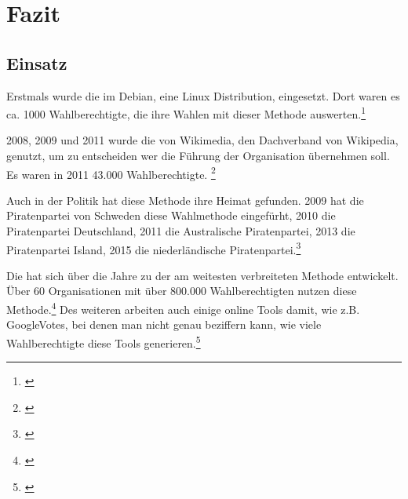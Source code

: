 \newpage
\section{Fazit}
\label{sec:Fazit}



\subsection{Einsatz} 
\label{sec:einsatz}
Erstmals wurde die  im Debian, eine Linux Distribution, eingesetzt. Dort waren es ca. 1000 Wahlberechtigte, die ihre Wahlen mit dieser Methode auswerten.\footnote{\Vgl \citet{Debian2018}}

2008, 2009 und 2011 wurde die \schulze von Wikimedia, den Dachverband von Wikipedia, genutzt, um zu entscheiden wer die Führung der Organisation übernehmen soll. Es waren in 2011 43.000 Wahlberechtigte. \footnote{\Vgl \citet{Schulze2017}}

Auch in der Politik hat diese Methode ihre Heimat gefunden. 2009 hat die Piratenpartei von Schweden diese Wahlmethode eingefürht, 2010 die Piratenpartei Deutschland, 2011 die Australische Piratenpartei, 2013 die Piratenpartei Island, 2015 die niederländische Piratenpartei.\footnote{\Vgl \citet{Lohmann2013}}

Die \schulze hat sich über die Jahre zu der am weitesten verbreiteten \condorcet Methode entwickelt. Über 60 Organisationen mit über 800.000 Wahlberechtigten nutzen diese Methode.\footnote{\Vgl \citet{Schulze2018}} Des weiteren arbeiten auch einige online Tools damit, wie z.B. GoogleVotes, bei denen man nicht genau beziffern kann, wie viele Wahlberechtigte diese Tools generieren.\footnote{\Vgl \citet{Hardt2015}}







